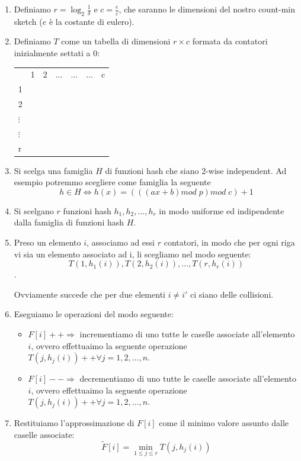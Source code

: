 \documentclass[a4paper,11pt]{book}
\begin{document}
\begin{enumerate}
\item Definiamo $r = \log_2 \frac{1}{\delta}$ e $c = \frac{e}{\varepsilon}$, che saranno le dimensioni del nostro count-min sketch ($e$ \`e la costante di eulero).

\item Definiamo $T$ come un tabella di dimensioni $r \times c$ formata da contatori inizialmente settati a 0:

\begin{center}
\begin{tabular}{p{0.5cm}|p{0.5cm}|p{0.5cm}|p{0.5cm}|p{0.5cm}|p{0.5cm}|p{0.5cm}|}
\multicolumn{1}{c}{} &
\multicolumn{1}{c}{1} &
\multicolumn{1}{c}{2} &
\multicolumn{1}{c}{$\ldots$} &
\multicolumn{1}{c}{$\ldots$} &
\multicolumn{1}{c}{$\ldots$} &
\multicolumn{1}{c}{c} \\
\cline{2-7}
1 & & & & & &  \\
\cline{2-7}
2 & & & & & &  \\
\cline{2-7}
$\vdots$ & & & & & &  \\
\cline{2-7}
$\vdots$ & & & & & &  \\
\cline{2-7}
r & & & & & &  \\
\cline{2-7}
\end{tabular}
\end{center}

\item Si scelga una famiglia $H$ di funzioni hash che siano 2-wise independent. Ad esempio potremmo scegliere come famiglia la seguente $$h \in H \Leftrightarrow h(x) = (((ax + b) mod\; p )mod\; c)+1$$

\item Si scelgano $r$ funzioni hash $h_1, h_2, \ldots, h_r$ in modo uniforme ed indipendente dalla famiglia di funzioni hash $H$.

\item Preso un elemento $i$, associamo ad essi $r$ contatori, in modo che per ogni riga vi sia un elemento associato ad i, li scegliamo nel modo seguente: $$T(1, h_1(i)), T(2, h_2(i)), \ldots, T(r, h_r(i))$$.

Ovviamente succede che per due elementi $i \neq i'$ ci siano delle collisioni.

\item Eseguiamo le operazioni del modo seguente:
\begin{itemize}
\item $F[i]++ \Rightarrow$ incrementiamo di uno tutte le caselle associate all'elemento $i$, ovvero effettuaimo la seguente operazione $T(j, h_j (i))++ \forall j = 1, 2, \ldots, n$.
\item $F[i]-- \Rightarrow$ decrementiamo di uno tutte le caselle associate all'elemento $i$, ovvero effettuaimo la seguente operazione $T(j, h_j (i))++ \forall j = 1, 2, \ldots, n$.
\end{itemize}

\item Restituiamo l'approssimazione di $F[i]$ come il minimo valore assunto dalle caselle associate: $$\tilde{F}[i] = \min_{1 \leq j \leq r}T(j, h_j (i))$$

\end{enumerate}
\end{document}
